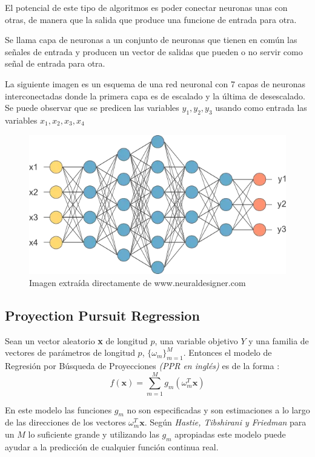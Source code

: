 \noindent El potencial de este tipo de algoritmos es poder conectar neuronas unas con otras, de manera que la salida que produce una funcione de entrada para otra.
\begin{defi}
Se llama capa de neuronas a un conjunto de neuronas que tienen en común las señales de entrada y producen un vector de salidas que pueden o no servir como señal de entrada para otra. 
\end{defi}

\noindent La siguiente imagen es un esquema de una red neuronal con 7 capas de neuronas interconectadas donde la primera capa es de escalado y la última de desescalado. Se puede observar que se predicen las variables $y_1, y_2, y_3$ usando como entrada las variables $x_1,x_2,x_3,x_4$ 

\begin{figure}[h]
\centering
\includegraphics[scale=0.5]{Documentos Extra/Imagenes/red-neuronal-grande.png}
\caption{Imagen extraída directamente de www.neuraldesigner.com}
\end{figure}
\subsection{Proyection Pursuit Regression}

\noindent Sean un vector aleatorio \textbf{x} de longitud $p$, una variable objetivo $Y$ y una familia de vectores de parámetros de longitud $p$, $\lbrace \omega_m\rbrace_{m=1}^M$. Entonces el modelo de Regresión por Búsqueda de Proyecciones \textit{(PPR en inglés)} es de la forma :
\begin{equation}
f(\textbf{x})=\sum_{m=1}^M g_m(\omega_m^T \textbf{x})
\end{equation}

\noindent En este modelo las funciones $g_m$ no son especificadas y son estimaciones a lo largo de las direcciones de los vectores $\omega_m^T \textbf{x}$. Según \textit{Hastie, Tibshirani y Friedman} \cite{Hastie 2001} para un $M$ lo suficiente grande y utilizando las $g_m$ apropiadas este modelo puede ayudar a la predicción de cualquier función continua real. 

